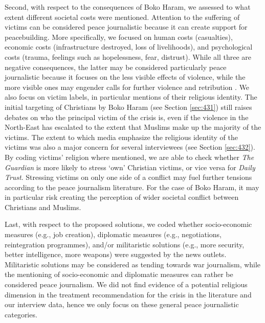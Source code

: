 Second, with respect to the consequences of Boko Haram, we assessed to what extent different societal costs were mentioned. Attention to the suffering of victims can be considered peace journalistic because it can create support for peacebuilding. More specifically, we focused on human costs (casualties), economic costs (infrastructure destroyed, loss of livelihoods), and psychological costs (trauma, feelings such as hopelessness, fear, distrust). While all three are negative consequences, the latter may be considered particularly peace journalistic because it focuses on the less visible effects of violence, while the more visible ones may engender calls for further violence and retribution \citep{Shinar2009}. We also focus on victim labels, in particular mentions of their religious identity. The initial targeting of Christians by Boko Haram (see Section \ref{sec:431}) still raises debates on who the principal victim of the crisis is, even if the violence in the North-East has escalated to the extent that Muslims make up the majority of the victims. The extent to which media emphasize the religious identity of the victims was also a major concern for several interviewees (see Section \ref{sec:432}). By coding victims' religion where mentioned, we are able to check whether \textit{The Guardian} is more likely to stress `own' Christian victims, or vice versa for \textit{Daily Trust}. Stressing victims on only one side of a conflict may fuel further tensions according to the peace journalism literature. For the case of Boko Haram, it may in particular risk creating the perception of wider societal conflict between Christians and Muslims.


Last, with respect to the proposed solutions, we coded whether socio-economic measures (e.g., job creation), diplomatic measures (e.g., negotiations, reintegration programmes), and/or militaristic solutions (e.g., more security, better intelligence, more weapons) were suggested by the news outlets. Militaristic solutions may be considered as tending towards war journalism, while the mentioning of socio-economic and diplomatic measures can rather be considered peace journalism. We did not find evidence of a potential religious dimension in the treatment recommendation for the crisis in the literature and our interview data, hence we only focus on these general peace journalistic categories.


